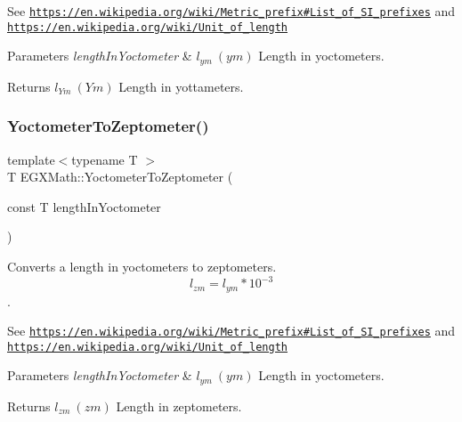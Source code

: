 See \href{https://en.wikipedia.org/wiki/Metric_prefix#List_of_SI_prefixes}{\tt https\+://en.\+wikipedia.\+org/wiki/\+Metric\+\_\+prefix\#\+List\+\_\+of\+\_\+\+S\+I\+\_\+prefixes} and \href{https://en.wikipedia.org/wiki/Unit_of_length}{\tt https\+://en.\+wikipedia.\+org/wiki/\+Unit\+\_\+of\+\_\+length} 
\begin{DoxyParams}{Parameters}
{\em length\+In\+Yoctometer} & $ l_{ym}\ (ym)$ Length in yoctometers. \\
\hline
\end{DoxyParams}
\begin{DoxyReturn}{Returns}
$ l_{Ym}\ (Ym)$ Length in yottameters. 
\end{DoxyReturn}
\mbox{\label{group___e_g_x_math-_conversions-_length_conversions-_yoctometer-_s_i_gab7c5e5b6659fb99614f1e47b8033ea85}} 
\subsubsection{\texorpdfstring{Yoctometer\+To\+Zeptometer()}{YoctometerToZeptometer()}}
{\footnotesize\ttfamily template$<$typename T $>$ \\
T E\+G\+X\+Math\+::\+Yoctometer\+To\+Zeptometer (\begin{DoxyParamCaption}\item[{const T}]{length\+In\+Yoctometer }\end{DoxyParamCaption})}



Converts a length in yoctometers to zeptometers. \[ l_{zm}=l_{ym} * 10^{-3} \]. 

See \href{https://en.wikipedia.org/wiki/Metric_prefix#List_of_SI_prefixes}{\tt https\+://en.\+wikipedia.\+org/wiki/\+Metric\+\_\+prefix\#\+List\+\_\+of\+\_\+\+S\+I\+\_\+prefixes} and \href{https://en.wikipedia.org/wiki/Unit_of_length}{\tt https\+://en.\+wikipedia.\+org/wiki/\+Unit\+\_\+of\+\_\+length} 
\begin{DoxyParams}{Parameters}
{\em length\+In\+Yoctometer} & $ l_{ym}\ (ym)$ Length in yoctometers. \\
\hline
\end{DoxyParams}
\begin{DoxyReturn}{Returns}
$ l_{zm}\ (zm)$ Length in zeptometers. 
\end{DoxyReturn}
\mbox{\label{group___e_g_x_math-_conversions-_length_conversions-_yoctometer-_s_i_gab7fc23a884fab0c6248edee754bd6e25}} 
